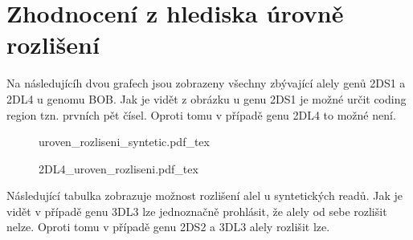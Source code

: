 \documentclass[czech,DP]{thesiskiv}
\numberwithin{equation}{section}
\begin{document}
\chapter{Zhodnocení z hlediska úrovně rozlišení}
Na následujícíh dvou grafech jsou zobrazeny všechny zbývající alely genů 2DS1 a 2DL4 u genomu BOB. Jak je vidět z obrázku u genu 2DS1 je možné určit coding region tzn. prvních pět čísel. Oproti tomu v případě genu 2DL4 to možné není. 


\begin{figure}[H]
	\centering
    \def\svgwidth{\columnwidth}
    {uroven_rozliseni_syntetic.pdf_tex} 
\end{figure}

\begin{figure}[H]
	\centering
    \def\svgwidth{\columnwidth}
    {2DL4_uroven_rozliseni.pdf_tex} 
\end{figure}

\noindent
Následující tabulka zobrazuje možnost rozlišení alel u syntetických readů. Jak je vidět v případě genu 3DL3 lze jednoznačně prohlásit, že alely od sebe rozlišit nelze. Oproti tomu v případě genu 2DS2 a 3DL3 alely rozlišit lze. 
\end{document}
